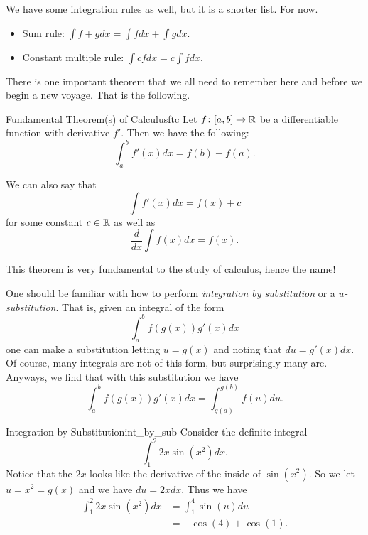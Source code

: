     We have some integration rules as well, but it is a shorter list. For now.
    \begin{itemize}
        \item Sum rule: $\displaystyle{\int f + g dx=\int f dx + \int g dx}$.
        \item Constant multiple rule: $\displaystyle{\int cf dx = c \int f dx}$.
    \end{itemize}
    
    There is one important theorem that we all need to remember here and before we begin a new voyage.  That is the following.
    
    \begin{thm}{Fundamental Theorem(s) of Calculus}{ftc}
    Let $f\colon [a,b] \to \mathbb{R}$ be a differentiable function with derivative $f'$.  Then we have the following:
    \[
    \int_a^b f'(x)dx = f(b)-f(a).
    \]
    
    We can also say that 
    \[
    \int f'(x)dx = f(x)+c
    \]
    for some constant $c\in \mathbb{R}$ as well as
    \[
    \frac{d}{dx} \int f(x)dx = f(x).
    \]
    \end{thm}
    \noindent This theorem is very fundamental to the study of calculus, hence the name!
    
    One should be familiar with how to perform \emph{integration by substitution} or a \emph{$u$-substitution}. That is, given an integral of the form
    \[
    \int_a^b f(g(x))g'(x)dx
    \]
    one can make a substitution letting $u=g(x)$ and noting that $du=g'(x)dx$.  Of course, many integrals are not of this form, but surprisingly many are. Anyways, we find that with this substitution we have
    \[
    \int_a^b f(g(x))g'(x)dx= \int_{g(a)}^{g(b)}f(u)du.
    \]
    
    \begin{ex}{Integration by Substitution}{int_by_sub}
        Consider the definite integral
        \[
        \int_1^2 2x\sin\left(x^2\right)dx.
        \]
        Notice that the $2x$ looks like the derivative of the inside of $\sin\left(x^2\right)$.  So we let $u=x^2=g(x)$ and we have $du=2xdx$. Thus we have
        \begin{align*}
            \int_1^2 2x\sin\left( x^2\right)dx &= \int_1^4 \sin(u)du\\
            &= -\cos(4)+\cos(1).
        \end{align*}
    \end{ex}
    
